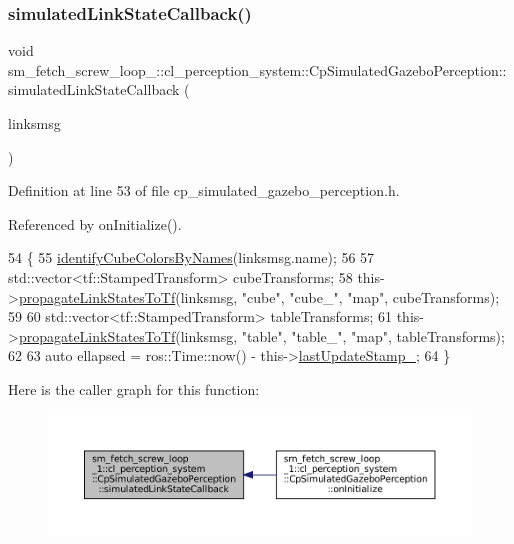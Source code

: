 \subsubsection{\texorpdfstring{simulated\+Link\+State\+Callback()}{simulatedLinkStateCallback()}}
{\footnotesize\ttfamily void sm\+\_\+fetch\+\_\+screw\+\_\+loop\+\_\+::cl\+\_\+perception\+\_\+system\+::\+Cp\+Simulated\+Gazebo\+Perception\+::simulated\+Link\+State\+Callback (\begin{DoxyParamCaption}\item[{const gazebo\+\_\+msgs\+::\+Link\+States \&}]{linksmsg }\end{DoxyParamCaption})\hspace{0.3cm}{\ttfamily [inline]}}



Definition at line 53 of file cp\+\_\+simulated\+\_\+gazebo\+\_\+perception.\+h.



Referenced by on\+Initialize().


\begin{DoxyCode}
54             \{
55                 \hyperlink{classsm__fetch__screw__loop__1_1_1cl__perception__system_1_1CpSimulatedGazeboPerception_ac54440671eebf57be9d13b07902e47b2}{identifyCubeColorsByNames}(linksmsg.name);
56 
57                 std::vector<tf::StampedTransform> cubeTransforms;
58                 this->\hyperlink{classsm__fetch__screw__loop__1_1_1cl__perception__system_1_1CpSimulatedGazeboPerception_a6eeedaceae67210042d0c2e9e1b497e7}{propagateLinkStatesToTf}(linksmsg, \textcolor{stringliteral}{"cube"}, \textcolor{stringliteral}{"cube\_"}, \textcolor{stringliteral}{"map"}, 
      cubeTransforms);
59 
60                 std::vector<tf::StampedTransform> tableTransforms;
61                 this->\hyperlink{classsm__fetch__screw__loop__1_1_1cl__perception__system_1_1CpSimulatedGazeboPerception_a6eeedaceae67210042d0c2e9e1b497e7}{propagateLinkStatesToTf}(linksmsg, \textcolor{stringliteral}{"table"}, \textcolor{stringliteral}{"table\_"}, \textcolor{stringliteral}{"map"}, 
      tableTransforms);
62 
63                 \textcolor{keyword}{auto} ellapsed = ros::Time::now() - this->\hyperlink{classsm__fetch__screw__loop__1_1_1cl__perception__system_1_1CpSimulatedGazeboPerception_af6f8deceff833ec35675cc5c23343f99}{lastUpdateStamp\_};
64             \}
\end{DoxyCode}
Here is the caller graph for this function\+:
\nopagebreak
\begin{figure}[H]
\begin{center}
\leavevmode
\includegraphics[width=350pt]{classsm__fetch__screw__loop__1_1_1cl__perception__system_1_1CpSimulatedGazeboPerception_a83c115c056525c3b3da790ef020b3add_icgraph}
\end{center}
\end{figure}


